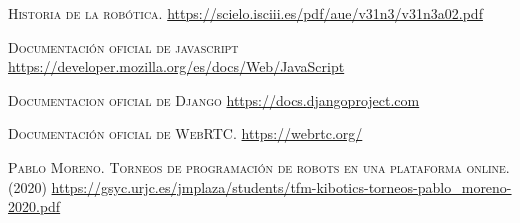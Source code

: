 \documentclass[a4paper, 12pt]{book}
\begin{document}



\cleardoublepage

\begin{thebibliography}{X}
	 \textsc{Historia de la robótica.}
	\url{https://scielo.isciii.es/pdf/aue/v31n3/v31n3a02.pdf}
	
	 \textsc{Documentación oficial de javascript}
	\url{https://developer.mozilla.org/es/docs/Web/JavaScript}	
	
	 \textsc{Documentacion oficial de Django}
	\url{https://docs.djangoproject.com}	
	
	 \textsc{Documentación oficial de WebRTC.}
	\url{https://webrtc.org/}
	
	
	 \textsc{Pablo Moreno. Torneos de programación de robots
en una plataforma online. (2020)}
	\url{https://gsyc.urjc.es/jmplaza/students/tfm-kibotics-torneos-pablo_moreno-2020.pdf}
	
	\bibitem{} \textsc{}
	\url{}
\end{thebibliography}
\end{document}
